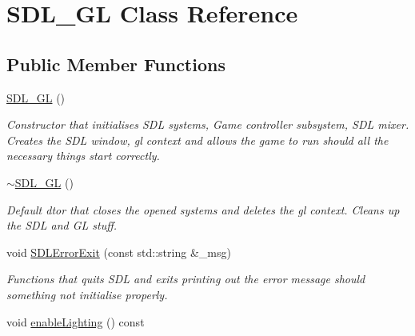 \hypertarget{classSDL__GL}{
\section{SDL\_\-GL Class Reference}
\label{classSDL__GL}
}
\subsection*{Public Member Functions}
\begin{DoxyCompactItemize}
\item 
\hypertarget{classSDL__GL_ab86fec81eac57f864f2240286dc9f174}{
\hyperlink{classSDL__GL_ab86fec81eac57f864f2240286dc9f174}{SDL\_\-GL} ()}
\label{classSDL__GL_ab86fec81eac57f864f2240286dc9f174}

\begin{DoxyCompactList}\small\item\em Constructor that initialises SDL systems, Game controller subsystem, SDL mixer. Creates the SDL window, gl context and allows the game to run should all the necessary things start correctly. \item\end{DoxyCompactList}\item 
\hypertarget{classSDL__GL_a0a6f3a1088ceb6a616faa32ab4794c59}{
\hyperlink{classSDL__GL_a0a6f3a1088ceb6a616faa32ab4794c59}{$\sim$SDL\_\-GL} ()}
\label{classSDL__GL_a0a6f3a1088ceb6a616faa32ab4794c59}

\begin{DoxyCompactList}\small\item\em Default dtor that closes the opened systems and deletes the gl context. Cleans up the SDL and GL stuff. \item\end{DoxyCompactList}\item 
void \hyperlink{classSDL__GL_afdb2059a9a295151d7d4bcaea4ec3f49}{SDLErrorExit} (const std::string \&\_\-msg)
\begin{DoxyCompactList}\small\item\em Functions that quits SDL and exits printing out the error message should something not initialise properly. \item\end{DoxyCompactList}\item 
\hypertarget{classSDL__GL_a902d897aef16c2c6bda4aa9f60802b4d}{
void \hyperlink{classSDL__GL_a902d897aef16c2c6bda4aa9f60802b4d}{enableLighting} () const }
\label{classSDL__GL_a902d897aef16c2c6bda4aa9f60802b4d}


\end{DoxyCompactItemize}
